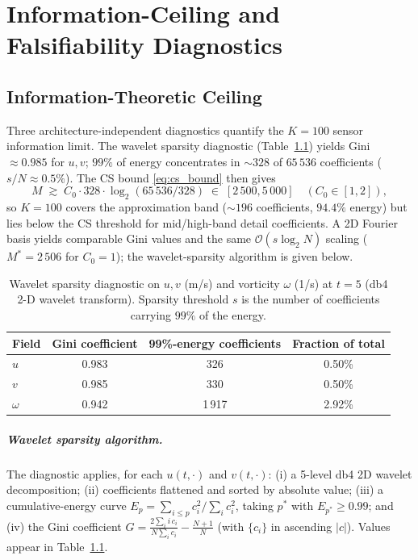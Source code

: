 \chapter{Information-Ceiling and Falsifiability Diagnostics}
\label{app:info_ceiling_diagnostics}

\section{Information-Theoretic Ceiling}
\label{sec:info_limit}

Three architecture-independent diagnostics quantify the $K=100$ sensor information limit. The wavelet sparsity diagnostic (Table~\ref{tab:wavelet}) yields Gini $\approx 0.985$ for $u, v$; $99\%$ of energy concentrates in $\sim 328$ of $65\,536$ coefficients ($s/N \approx 0.5\%$). The CS bound \eqref{eq:cs_bound} then gives
\begin{equation}
    M \;\gtrsim\; C_0 \cdot 328 \cdot \log_2(65\,536/328) \;\in\; [2\,500, 5\,000] \quad (C_0\in[1,2]),
\end{equation}
so $K=100$ covers the approximation band ($\sim 196$ coefficients, $94.4\%$ energy) but lies below the CS threshold for mid/high-band detail coefficients. A 2D Fourier basis yields comparable Gini values and the same $\mathcal{O}(s\log_2 N)$ scaling ($M^*=2\,506$ for $C_0=1$); the wavelet-sparsity algorithm is given below.

\begin{table}[!htbp]
    \centering
    \caption{Wavelet sparsity diagnostic on $u, v$ (m/s) and vorticity $\omega$ (1/s) at $t=5$ (db4 2-D wavelet transform). Sparsity threshold $s$ is the number of coefficients carrying $99\%$ of the energy.}
    \label{tab:wavelet}
    \small
    \begin{tabular}{lccc}
    \toprule
    \textbf{Field} & \textbf{Gini coefficient} & \textbf{99\%-energy coefficients} & \textbf{Fraction of total} \\
    \midrule
    $u$ & 0.983 & 326 & 0.50\% \\
    $v$ & 0.985 & 330 & 0.50\% \\
    $\omega$ & 0.942 & 1\,917 & 2.92\% \\
    \bottomrule
    \end{tabular}
\end{table}

\paragraph{Wavelet sparsity algorithm.}
The diagnostic applies, for each $u(t,\cdot)$ and $v(t,\cdot)$: (i) a 5-level db4 2D wavelet decomposition; (ii) coefficients flattened and sorted by absolute value; (iii) a cumulative-energy curve $E_p = \sum_{i\le p} c_i^2 / \sum_i c_i^2$, taking $p^*$ with $E_{p^*}\ge 0.99$; and (iv) the Gini coefficient $G = \frac{2\sum_i i\,c_i}{N\sum_i c_i} - \frac{N+1}{N}$ (with $\{c_i\}$ in ascending $|c|$). Values appear in Table~\ref{tab:wavelet}.

